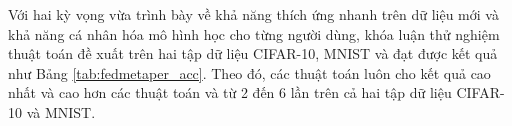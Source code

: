 Với hai kỳ vọng vừa trình bày về khả năng thích ứng nhanh trên dữ liệu mới và khả năng cá nhân hóa mô hình học cho từng người dùng, khóa luận thử nghiệm thuật toán đề xuất trên hai tập dữ liệu CIFAR-10, MNIST và đạt được kết quả như Bảng \ref{tab:fedmetaper_acc}. Theo đó, các thuật toán  luôn cho kết quả cao nhất và cao hơn các thuật toán  và  từ 2 đến 6 lần trên cả hai tập dữ liệu CIFAR-10 và MNIST.

\begin{table}[H]
    \centering
    \caption{Bảng độ chính xác (\%) của thuật toán FedPer và các thuật toán FedMeta-Per tính trên điểm dữ liệu (dữ liệu Non-IID)}
    \label{tab:fedmetaper_acc}
\end{table}

